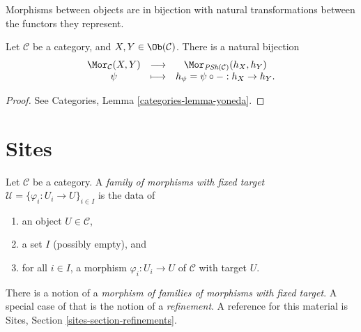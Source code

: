 \begin{lemma}[Yoneda]
\label{lemma-yoneda}
\begin{slogan}
Morphisms between objects are in bijection with natural transformations
between the functors they represent.
\end{slogan}
Let $\mathcal{C}$ be a category, and $X, Y \in
\Ob(\mathcal{C})$. There is a natural bijection
$$
\begin{matrix}
\Mor_\mathcal{C}(X, Y) &
\longrightarrow &
\Mor_{\textit{PSh}(\mathcal{C})} (h_X, h_Y) \\
\psi &
\longmapsto &
h_\psi = \psi \circ - : h_X \to h_Y.
\end{matrix}
$$
\end{lemma}

\begin{proof}
See
Categories, Lemma \ref{categories-lemma-yoneda}.
\end{proof}




\section{Sites}
\label{section-sites}


\begin{definition}
\label{definition-family-morphisms-fixed-target}
Let $\mathcal{C}$ be a category. A {\it family of morphisms with fixed target}
$\mathcal{U} = \{\varphi_i : U_i \to U\}_{i\in I}$ is the data of
\begin{enumerate}
\item an object $U \in \mathcal{C}$,
\item a set $I$ (possibly empty), and
\item for all $i\in I$, a morphism $\varphi_i : U_i \to U$ of $\mathcal{C}$
with target $U$.
\end{enumerate}
\end{definition}

\noindent
There is a notion of a {\it morphism of families of morphisms with fixed
target}. A special case of that is the notion of a {\it refinement}.
A reference for this material is
Sites, Section \ref{sites-section-refinements}.

